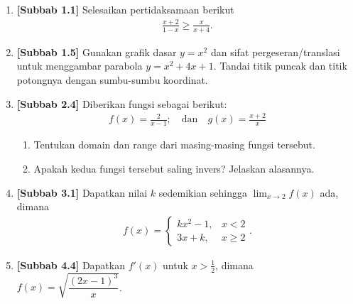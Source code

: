 \documentclass[10pt,openany,a4paper]{article}
\theoremstyle{definition}
\theoremstyle{definition}
\theoremstyle{plain}
\begin{document}
\newpage

\begin{enumerate}
    \item \textbf{[Subbab 1.1]} Selesaikan pertidaksamaan berikut
    \begin{align*}
        \frac{x+2}{1-x}\geq\frac{x}{x+4}.
    \end{align*}

    \item \textbf{[Subbab 1.5]} Gunakan grafik dasar $y=x^2$ dan sifat pergeseran/translasi untuk menggambar parabola $y=x^2+4x+1$. Tandai titik puncak dan titik potongnya dengan sumbu-sumbu koordinat.

    \item \textbf{[Subbab 2.4]} Diberikan fungsi sebagai berikut:
    \begin{align*}
        f(x)=\frac{2}{x-1};\quad \text{dan}\quad g(x)=\frac{x+2}{x}
    \end{align*}
    \begin{enumerate}
        \item Tentukan domain dan range dari masing-masing fungsi tersebut.
        \item Apakah kedua fungsi tersebut saling invers? Jelaskan alasannya.
    \end{enumerate}

    \item \textbf{[Subbab 3.1]} Dapatkan nilai $k$ sedemikian sehingga $\displaystyle\lim_{x\to 2}f(x)$ ada, dimana
    \begin{align*}
        f(x)=\begin{cases}
            kx^2-1, & x<2\\
            3x+k, & x\geq 2
        \end{cases}.
    \end{align*}

    \item \textbf{[Subbab 4.4]} Dapatkan $f'(x)$ untuk $x>\frac{1}{2}$, dimana $f(x)=\sqrt{\dfrac{(2x-1)^3}{x}}$.
\end{enumerate}

\newpage
\end{document}
